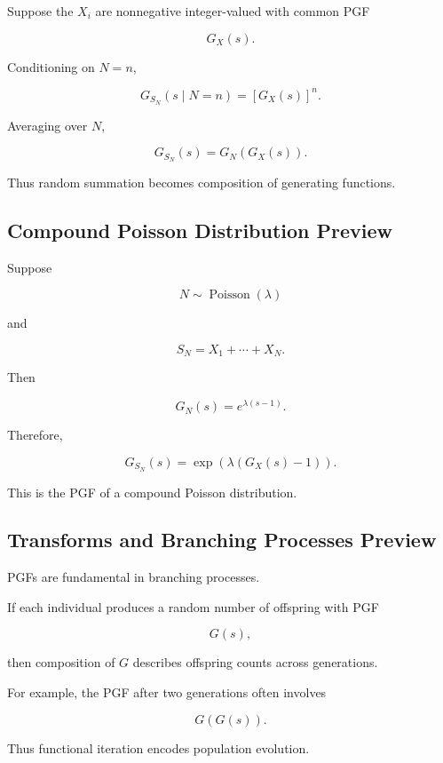 Suppose the \(X_i\) are nonnegative integer-valued with common PGF

\[
G_X(s).
\]

Conditioning on \(N=n\),

\[
G_{S_N}(s\mid N=n)
=
[G_X(s)]^n.
\]

Averaging over \(N\),

\[
\boxed{
G_{S_N}(s)
=
G_N(G_X(s)).
}
\]

Thus random summation becomes composition of generating functions.

\subsection{Compound Poisson Distribution Preview}
\label{subsec:compound-poisson-transform-preview}

Suppose

\[
N\sim\operatorname{Poisson}(\lambda)
\]

and

\[
S_N
=
X_1+\cdots+X_N.
\]

Then

\[
G_N(s)
=
e^{\lambda(s-1)}.
\]

Therefore,

\[
\boxed{
G_{S_N}(s)
=
\exp
\left(
\lambda(G_X(s)-1)
\right).
}
\]

This is the PGF of a compound Poisson distribution.

\subsection{Transforms and Branching Processes Preview}
\label{subsec:transforms-branching-processes}

PGFs are fundamental in branching processes.

If each individual produces a random number of offspring with PGF

\[
G(s),
\]

then composition of \(G\) describes offspring counts across
generations.

For example, the PGF after two generations often involves

\[
\boxed{
G(G(s)).
}
\]

Thus functional iteration encodes population evolution.

